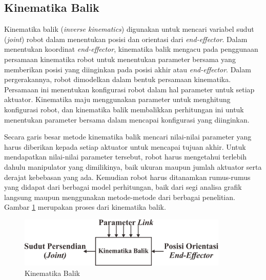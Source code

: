 \subsection{Kinematika Balik}
Kinematika balik (\textit{inverse kinematics}) digunakan untuk mencari variabel sudut (\textit{joint}) robot dalam menentukan posisi dan orientasi dari \textit{end-effector}. Dalam menentukan koordinat \textit{end-effector}, kinematika balik mengacu pada penggunaan persamaan kinematika robot untuk menentukan parameter bersama yang memberikan posisi yang diinginkan pada posisi akhir atau \textit{end-effector}.  Dalam pergerakannya, robot dimodelkan dalam bentuk persamaan kinematika. Persamaan ini menentukan konfigurasi robot dalam hal parameter untuk setiap aktuator. Kinematika maju menggunakan parameter untuk menghitung konfigurasi robot, dan kinematika balik membalikkan perhitungan ini untuk menentukan parameter bersama dalam mencapai konfigurasi yang diinginkan\cite{cahyono2015}. 

Secara garis besar metode kinematika balik mencari nilai-nilai parameter yang harus diberikan kepada setiap aktuator untuk mencapai tujuan akhir. Untuk mendapatkan nilai-nilai parameter tersebut, robot harus mengetahui terlebih dahulu manipulator yang dimilikinya, baik ukuran maupun jumlah aktuator serta derajat kebebasan yang ada. Kemudian robot harus ditanamkan rumus-rumus yang didapat dari berbagai model perhitungan, baik dari segi analisa grafik langsung maupun menggunakan metode-metode dari berbagai penelitian\cite{cahyono2}. Gambar \ref{pic.kinematikabalik} merupakan proses dari kinematika balik.

	\begin{figure}[H]
	\centering
	\includegraphics[width=10cm]{gambar/kinematika_balik.png}
	\caption{Kinematika Balik}
	\label{pic.kinematikabalik}
\end{figure}

